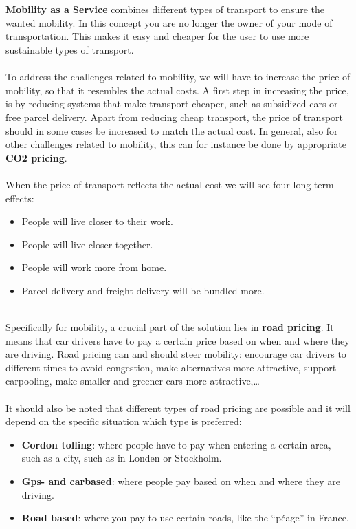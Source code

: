 \documentclass[../summary.tex]{subfiles}
\begin{document}
	\\\\
	\textbf{Mobility as a Service} combines different types of transport to ensure the wanted mobility. In this concept you are no longer the owner of your mode of transportation. This makes it easy and cheaper for the user to use more sustainable types of transport.
	\\\\
	To address the challenges related to mobility, we will have to increase the price of mobility, so that it resembles the actual costs. A first step in increasing the price, is by reducing systems that make transport cheaper, such as subsidized cars or free parcel delivery. Apart from reducing cheap transport, the price of transport should in some cases be increased to match the actual cost. In general, also for other challenges related to mobility, this can for instance be done by appropriate \textbf{CO2 pricing}.\\
	\\
	When the price of transport reflects the actual cost we will see four long term effects:
	\begin{itemize}
		\setlength{\itemsep}{0pt}
		\item People will live closer to their work.
		\item People will live closer together.
		\item People will work more from home.
		\item Parcel delivery and freight delivery will be bundled more.
	\end{itemize}
	\ \\
	Specifically for mobility, a crucial part of the solution lies in \textbf{road pricing}. It means that car drivers have to pay a certain price based on when and where they are driving. Road pricing can and should steer mobility: encourage car drivers to different times to avoid congestion, make alternatives more attractive, support carpooling, make smaller and greener cars more attractive,…\\
	\\
	It should also be noted that different types of road pricing are possible and it will depend on the specific situation which type is preferred:
	\begin{itemize}
		\setlength{\itemsep}{0pt}
		\item \textbf{Cordon tolling}: where people have to pay when entering a certain area, such as a city, such as in Londen or Stockholm.
		\item \textbf{Gps- and carbased}: where people pay based on when and where they are driving.
		\item \textbf{Road based}: where you pay to use certain roads, like the “péage” in France.
	\end{itemize}
	
\end{document}

